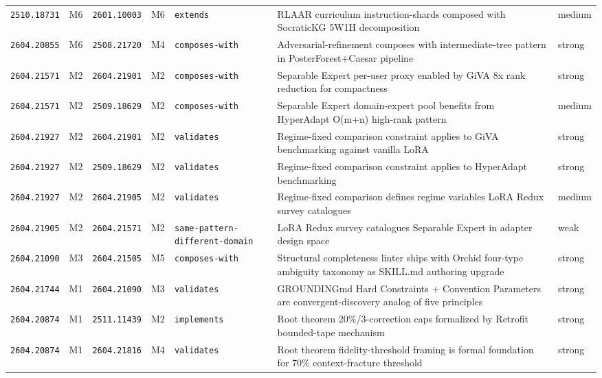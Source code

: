 \documentclass[11pt,letterpaper]{article}
\newcommand{\arxivid}[1]{\texttt{\textcolor{accent}{#1}}}
\begin{document}
\begin{footnotesize}
\begin{longtable}{@{}L{0.09\textwidth} L{0.03\textwidth} L{0.09\textwidth} L{0.03\textwidth} L{0.13\textwidth} L{0.40\textwidth} L{0.06\textwidth}@{}}
\arxivid{2510.18731} & M6 & \arxivid{2601.10003} & M6 & \texttt{\small extends} & RLAAR curriculum instruction-shards composed with SocraticKG 5W1H decomposition & medium \\
\arxivid{2604.20855} & M6 & \arxivid{2508.21720} & M4 & \texttt{\small composes-with} & Adversarial-refinement composes with intermediate-tree pattern in PosterForest+Caesar pipeline & strong \\
\arxivid{2604.21571} & M2 & \arxivid{2604.21901} & M2 & \texttt{\small composes-with} & Separable Expert per-user proxy enabled by GiVA 8x rank reduction for compactness & strong \\
\arxivid{2604.21571} & M2 & \arxivid{2509.18629} & M2 & \texttt{\small composes-with} & Separable Expert domain-expert pool benefits from HyperAdapt O(m+n) high-rank pattern & medium \\
\arxivid{2604.21927} & M2 & \arxivid{2604.21901} & M2 & \texttt{\small validates} & Regime-fixed comparison constraint applies to GiVA benchmarking against vanilla LoRA & strong \\
\arxivid{2604.21927} & M2 & \arxivid{2509.18629} & M2 & \texttt{\small validates} & Regime-fixed comparison constraint applies to HyperAdapt benchmarking & strong \\
\arxivid{2604.21927} & M2 & \arxivid{2604.21905} & M2 & \texttt{\small validates} & Regime-fixed comparison defines regime variables LoRA Redux survey catalogues & medium \\
\arxivid{2604.21905} & M2 & \arxivid{2604.21571} & M2 & \texttt{\small same-pattern-different-domain} & LoRA Redux survey catalogues Separable Expert in adapter design space & weak \\
\arxivid{2604.21090} & M3 & \arxivid{2604.21505} & M5 & \texttt{\small composes-with} & Structural completeness linter ships with Orchid four-type ambiguity taxonomy as SKILL.md authoring upgrade & strong \\
\arxivid{2604.21744} & M1 & \arxivid{2604.21090} & M3 & \texttt{\small validates} & GROUNDINGmd Hard Constraints + Convention Parameters are convergent-discovery analog of five principles & strong \\
\arxivid{2604.20874} & M1 & \arxivid{2511.11439} & M2 & \texttt{\small implements} & Root theorem 20\%/3-correction caps formalized by Retrofit bounded-tape mechanism & strong \\
\arxivid{2604.20874} & M1 & \arxivid{2604.21816} & M4 & \texttt{\small validates} & Root theorem fidelity-threshold framing is formal foundation for 70\% context-fracture threshold & strong \\

\end{longtable}
\end{footnotesize}
\end{document}
